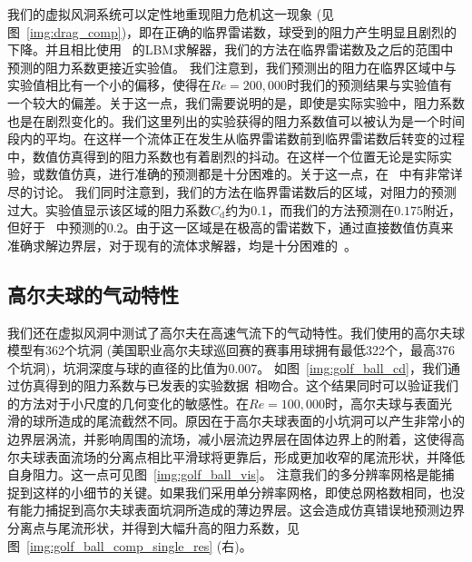我们的虚拟风洞系统可以定性地重现阻力危机这一现象 (见图~\ref{img:drag_comp})，即在正确的临界雷诺数，球受到的阻力产生明显且剧烈的下降。并且相比使用~\citep{Tao-2018-b} 的LBM求解器，我们的方法在临界雷诺数及之后的范围中预测的阻力系数更接近实验值。
我们注意到，我们预测出的阻力在临界区域中与实验值相比有一个小的偏移，使得在$Re=200,000$时我们的预测结果与实验值有一个较大的偏差。关于这一点，我们需要说明的是，即使是实际实验中，阻力系数也是在剧烈变化的。我们这里列出的实验获得的阻力系数值可以被认为是一个时间段内的平均。在这样一个流体正在发生从临界雷诺数前到临界雷诺数后转变的过程中，数值仿真得到的阻力系数也有着剧烈的抖动。在这样一个位置无论是实际实验，或数值仿真，进行准确的预测都是十分困难的。关于这一点，在~\citep{Geier-2017-b} 中有非常详尽的讨论。
我们同时注意到，我们的方法在临界雷诺数后的区域，对阻力的预测过大。实验值显示该区域的阻力系数$C_\text{d}$约为0.1，而我们的方法预测在$0.175$附近，但好于~\citep{Tao-2018-b} 中预测的$0.2$。由于这一区域是在极高的雷诺数下，通过直接数值仿真来准确求解边界层，对于现有的流体求解器，均是十分困难的~\citep{Tiwari-2020}。

\subsection{高尔夫球的气动特性}
我们还在虚拟风洞中测试了高尔夫在高速气流下的气动特性。我们使用的高尔夫球模型有362个坑洞 (美国职业高尔夫球巡回赛的赛事用球拥有最低322个，最高376个坑洞)，坑洞深度与球的直径的比值为0.007。
如图~\ref{img:golf_ball_cd}，我们通过仿真得到的阻力系数与已发表的实验数据~\citep{Bearman-1976, Aoki-2010}相吻合。这个结果同时可以验证我们的方法对于小尺度的几何变化的敏感性。在$Re=100,000$时，高尔夫球与表面光滑的球所造成的尾流截然不同。原因在于高尔夫球表面的小坑洞可以产生非常小的边界层涡流，并影响周围的流场，减小层流边界层在固体边界上的附着，这使得高尔夫球表面流场的分离点相比平滑球将更靠后，形成更加收窄的尾流形状，并降低自身阻力。这一点可见图~\ref{img:golf_ball_vis}。
注意我们的多分辨率网格是能捕捉到这样的小细节的关键。如果我们采用单分辨率网格，即使总网格数相同，也没有能力捕捉到高尔夫球表面坑洞所造成的薄边界层。这会造成仿真错误地预测边界分离点与尾流形状，并得到大幅升高的阻力系数，见图~\ref{img:golf_ball_comp_single_res} (右)。

